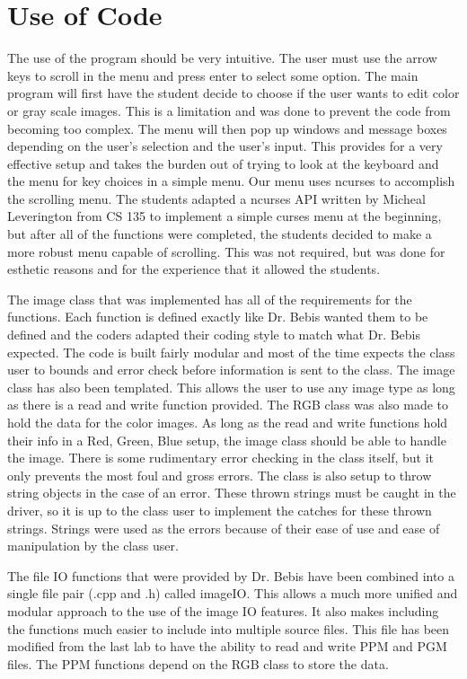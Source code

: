 \documentclass[pdftex, 11pt]{article}
\begin{document}
\section{Use of Code}

The use of the program should be very intuitive. The user must use the arrow keys to scroll in the menu and press enter
to select some option. The main program will first have the student decide to choose if the user wants to edit color or
gray scale images. This is a limitation and was done to prevent the code from becoming too complex. The menu will then
pop up windows and message boxes depending on the user's selection and the user's input. This provides for a very
effective setup and takes the burden out of trying to look at the keyboard and the menu for key choices in a simple
menu. Our menu uses ncurses to accomplish the scrolling menu. The students adapted a ncurses API written by Micheal
Leverington from CS 135 to implement a simple curses menu at the beginning, but after all of the functions were
completed, the students decided to make a more robust menu capable of scrolling. This was not required, but was done for
esthetic reasons and for the experience that it allowed the students.

The image class that was implemented has all of the requirements for the functions. Each function is defined exactly
like Dr. Bebis wanted them to be defined and the coders adapted their coding style to match what Dr. Bebis expected. The
code is built fairly modular and most of the time expects the class user to bounds and error check before information is
sent to the class. The image class has also been templated. This allows the user to use any image type as long as there
is a read and write function provided. The RGB class was also made to hold the data for the color images. As long as the
read and write functions hold their info in a Red, Green, Blue setup, the image class should be able to handle the
image. There is some rudimentary error checking in the class itself, but it only prevents the most foul and
gross errors. The class is also setup to throw string objects in the case of an error. These thrown strings must be
caught in the driver, so it is up to the class user to implement the catches for these thrown strings. Strings were used
as the errors because of their ease of use and ease of manipulation by the class user. 

The file IO functions that were provided by Dr. Bebis have been combined into a single file pair (.cpp and .h) called
imageIO. This allows a much more unified and modular approach to the use of the image IO features. It also makes
including the functions much easier to include into multiple source files. This file has been modified from the last lab
to have the ability to read and write PPM and PGM files. The PPM functions depend on the RGB class to store the data.
\end{document}
